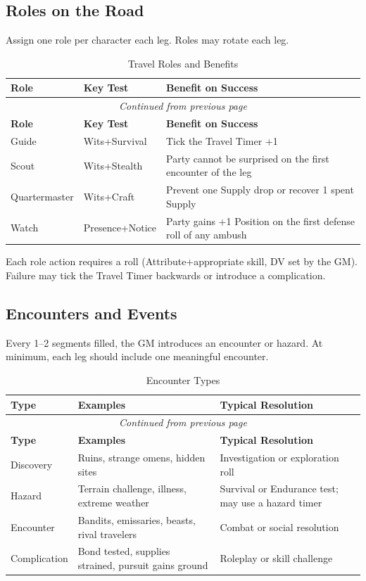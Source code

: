 \subsection{Roles on the Road}
Assign one role per character each leg. Roles may rotate each leg.

\begin{center}
\begin{longtable}{lll}
\caption{Travel Roles and Benefits}\\
\toprule
\textbf{Role} & \textbf{Key Test} & \textbf{Benefit on Success} \\
\midrule
\endfirsthead
\multicolumn{3}{c}{\emph{Continued from previous page}} \\
\toprule
\textbf{Role} & \textbf{Key Test} & \textbf{Benefit on Success} \\
\midrule
\endhead
\bottomrule
\endfoot
Guide & Wits+Survival & Tick the Travel Timer +1 \\
Scout & Wits+Stealth & Party cannot be surprised on the first encounter of the leg \\
Quartermaster & Wits+Craft & Prevent one Supply drop or recover 1 spent Supply \\
Watch & Presence+Notice & Party gains +1 Position on the first defense roll of any ambush \\
\end{longtable}
\end{center}

Each role action requires a roll (Attribute+appropriate skill, DV set by the GM). Failure may tick the Travel Timer backwards or introduce a complication.

\subsection{Encounters and Events}
Every 1--2 segments filled, the GM introduces an encounter or hazard. At minimum, each leg should include one meaningful encounter.

\begin{center}
\begin{longtable}{lll}
\caption{Encounter Types}\\
\toprule
\textbf{Type} & \textbf{Examples} & \textbf{Typical Resolution} \\
\midrule
\endfirsthead
\multicolumn{3}{c}{\emph{Continued from previous page}} \\
\toprule
\textbf{Type} & \textbf{Examples} & \textbf{Typical Resolution} \\
\midrule
\endhead
\bottomrule
\endfoot
Discovery & Ruins, strange omens, hidden sites & Investigation or exploration roll \\
Hazard & Terrain challenge, illness, extreme weather & Survival or Endurance test; may use a hazard timer \\
Encounter & Bandits, emissaries, beasts, rival travelers & Combat or social resolution \\
Complication & Bond tested, supplies strained, pursuit gains ground & Roleplay or skill challenge \\
\end{longtable}
\end{center}

